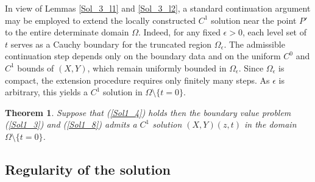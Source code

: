 \documentclass[3p,11pt]{elsarticle}
\numberwithin{equation}{section}
\newtheorem{theorem}{Theorem}[section]
\begin{document}
In view of Lemmas \ref{Sol_3_l1} and \ref{Sol_3_l2}, a standard continuation argument may be employed to extend the locally constructed $C^1$ solution near the point $P'$ to the entire determinate domain $\Omega$. Indeed, for any fixed $\epsilon>0$, each level set of $t$ serves as a Cauchy boundary for the truncated region $\Omega_\epsilon$. The admissible continuation step depends only on the boundary data and on the uniform $C^0$ and $C^1$ bounds of $(X, Y)$, which remain uniformly bounded in $\Omega_\epsilon$. Since $\Omega_\epsilon$ is compact, the extension procedure requires only finitely many steps. As $\epsilon$ is arbitrary, this yields a $C^1$ solution in $\Omega\setminus\{t=0\}$.
\begin{theorem}\label{Sol3_th2}
    Suppose that (\ref{Sol1_4}) holds then the boundary value problem (\ref{Sol1_3}) and (\ref{Sol1_8}) admits a $C^1$ solution $(X, Y)(z, t)$ in the domain $\Omega\setminus\{t=0\}$.
\end{theorem}

\subsection{Regularity of the solution}
\end{document}
